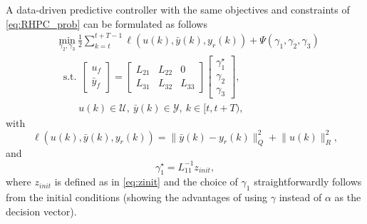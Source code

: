 \documentclass[letterpaper, 10 pt, conference]{ieeeconf}  %
\begin{document}
A data-driven predictive controller with the same objectives and constraints of \eqref{eq:RHPC_prob} can be formulated as follows \cite{breschi2022role}
\begin{subequations}\label{eq:RHPC_prob_dd_gamma}
	\begin{align}
		&\underset{\gamma_2,\gamma_3}{\mbox{min}}~\frac{1}{2}\sum_{k=t}^{t+T-1} \ell(u(k),\bar y(k),y_{r}(k)) + \Psi(\gamma_1,\gamma_2,\gamma_3) \label{eq:cost_gammaDDPC}\\
		&~~\mbox{s.t.}~~\begin{bmatrix}
			u_{f}\\
			\bar y_{f}
		\end{bmatrix}=\begin{bmatrix}
			L_{21} & L_{22} & 0 \\
			L_{31} & L_{32} & L_{33}
		\end{bmatrix}\begin{bmatrix}
			\gamma_{1}^\star\\\gamma_{2} \\ \gamma_3
		\end{bmatrix} \label{eq:prediction_model3},\\
		&~~~~~~~~~u(k) \in \mathcal{U},~\bar y(k) \in \mathcal{Y},~k \in [t,t+T), \label{eq:constraints2}
	\end{align}
\end{subequations}
with 
\begin{equation}\label{eq:loss}
	\ell(u(k),\bar y(k),y_{r}(k))=\|\bar y(k)\!-\! y_{r}(k)
	\|_{Q}^{2}\!+\!\|u(k)\|_{R}^{2},
\end{equation}
and
\begin{equation}\label{eq:init_terms}
	\gamma_{1}^\star=
	L_{11}^{-1}z_{init},
\end{equation}
where $z_{init}$ is defined as in \eqref{eq:zinit} and the choice of $\gamma_{1}$ straightforwardly follows from the initial conditions (showing the advantages of using $\gamma$ instead of $\alpha$ as the decision vector). 


\end{document}
